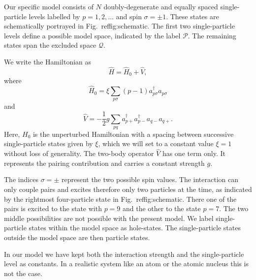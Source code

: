 \documentclass[%
twoside,                 %
final,                   %
10pt]{article}
\begin{document}
Our specific model consists of $N$ doubly-degenerate and equally
spaced single-particle levels labelled by $p=1,2,\dots$ and spin
$\sigma=\pm 1$.  These states are schematically portrayed in
Fig.~ref{fig:schematic}.  The first two single-particle levels define
a possible model space, indicated by the label $\mathcal{P}$.  The
remaining states span the excluded space $\mathcal{Q}$.

We write the Hamiltonian as
\[ \hat{H} = \hat{H}_0 + \hat{V} , \]
where
\[
\hat{H}_0=\xi\sum_{p\sigma}(p-1)a_{p\sigma}^{\dagger}a_{p\sigma}
\]
and
\[
\hat{V}=-\frac{1}{2}g\sum_{pq}a^{\dagger}_{p+}
a^{\dagger}_{p-}a_{q-}a_{q+}.
\]
Here, $H_0$ is the unperturbed Hamiltonian with a spacing between
successive single-particle states given by $\xi$, which we will set to
a constant value $\xi=1$ without loss of generality. The two-body
operator $\hat{V}$ has one term only. It represents the pairing
contribution and carries a constant strength $g$.

The indices
$\sigma=\pm$ represent the two possible spin values. The interaction
can only couple pairs and excites therefore only two particles at the
time, as indicated by the rightmost four-particle state in
Fig.~ref{fig:schematic}. There one of the pairs is excited to the
state with $p=9$ and the other to the state $p=7$. The two middle
possibilities are not possible with the present model.  We label
single-particle states within the model space as hole-states. The
single-particle states outside the model space are then particle
states. 

In our model we have kept both the interaction strength and the
single-particle level as constants.  In a realistic system like an
atom or the atomic nucleus this is not the case.
\end{document}
